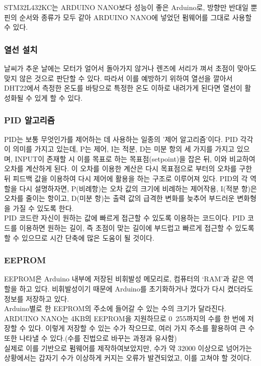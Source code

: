 STM32L432KC는 ARDUINO NANO보다 성능이 좋은 Arduino로, 방향만 반대일 뿐 핀의 순서와 종류가 모두 같아 ARDUINO NANO에 넣었던 펌웨어를 그대로 사용할 수 있다.

\subsubsection{열선 설치}

날씨가 추운 날에는 모터가 얼어서 돌아가지 않거나 렌즈에 서리가 껴서 초점이 맞아도 맞지 않은 것으로 판단할 수 있다. 따라서 이를 예방하기 위하여 열선을 깔아서 DHT22에서 측정한 온도를 바탕으로 특정한 온도 이하로 내려가게 된다면 열선이 활성화될 수 있게 할 수 있다.

\subsubsection{PID 알고리즘}

PID는 보통 무엇인가를 제어하는 데 사용하는 일종의 ’제어 알고리즘’이다. PID 각각이 의미를 가지고 있는데, P는 제어, I는 적분, D는 미분 항의 세 가지를 가지고 있으며, INPUT이 존재할 시 이를 목표로 하는 목표점(setpoint)을 잡은 뒤, 이와 비교하여 오차를 계산하게 된다. 이 오차를 이용한 계산은 다시 목표점으로 부터의 오차를 구한 뒤 피드백 값을 이용하여 다시 제어에 활용을 하는 구조로 이루어져 있다.
PID의 각 역할을 다시 설명하자면, P(비례항)는 오차 값의 크기에 비례하는 제어작용, I(적분 항)은 오차를 줄이는 항이고, D(미분 항)는 출력 값의 급격한 변화를 늦추어 부드러운 변화형을 가질 수 있도록 한다.\\
PID 코드란 자신이 원하는 값에 빠르게 접근할 수 있도록 이용하는 코드이다. PID 코드를 이용하면 원하는 길이, 즉 초점이 맞는 길이에 부드럽고 빠르게 접근할 수 있도록 할 수 있으므로 시간 단축에 많은 도움이 될 것이다.

\subsubsection{EEPROM}

EEPROM은 Arduino 내부에 저장된 비휘발성 메모리로, 컴퓨터의 ‘RAM’과 같은 역할을 하고 있다. 비휘발성이기 때문에 Arduino를 초기화하거나 껐다가 다시 켰더라도 정보를 저장하고 있다.\\
Arduino별로 한 EEPROM의 주소에 들어갈 수 있는 수의 크기가 달라진다. ARDUINO NANO는 4KB의 EEPROM을 지원하므로 0~255까지의 수를 한 번에 저장할 수 있다. 이렇게 저장할 수 있는 수가 작으므로, 여러 가지 주소를 활용하여 큰 수 또한 나타낼 수 있다.(수를 진법으로 바꾸는 과정과 유사함)\\
실제로 이를 기반으로 펌웨어를 제작하여보았지만, 수가 약 32000 이상으로 넘어가는 상황에서는 갑자기 수가 이상하게 커지는 오류가 발견되었고, 이를 고쳐야 할 것이다.

